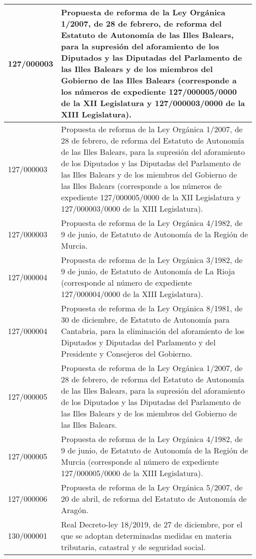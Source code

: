 {\begin{table}[H]
\begin{center}
\begin{tabularx}{\linewidth}{| l | X |}
\hline
127/000003 & Propuesta de reforma de la Ley Orgánica 1/2007, de 28 de febrero, de reforma del Estatuto de Autonomía de las Illes Balears, para la supresión del aforamiento de los Diputados y las Diputadas del Parlamento de las Illes Balears y de los miembros del Gobierno de las Illes Balears (corresponde a los números de expediente 127/000005/0000 de la XII Legislatura y 127/000003/0000 de la XIII Legislatura). \\
\hline
127/000003 & Propuesta de reforma de la Ley Orgánica 1/2007, de 28 de febrero, de reforma del Estatuto de Autonomía de las Illes Balears, para la supresión del aforamiento de los Diputados y las Diputadas del Parlamento de las Illes Balears y de los miembros del Gobierno de las Illes Balears (corresponde a los números de expediente 127/000005/0000 de la XII Legislatura y 127/000003/0000 de la XIII Legislatura). \\
\hline
127/000003 & Propuesta de reforma de la Ley Orgánica 4/1982, de 9 de junio, de Estatuto de Autonomía de la Región de Murcia. \\
\hline
127/000004 & Propuesta de reforma de la Ley Orgánica 3/1982, de 9 de junio, de Estatuto de Autonomía de La Rioja (corresponde al número de expediente 127/000004/0000 de la XIII Legislatura). \\
\hline
127/000004 & Propuesta de reforma de la Ley Orgánica 8/1981, de 30 de diciembre, de Estatuto de Autonomía para Cantabria, para la eliminación del aforamiento de los Diputados y Diputadas del Parlamento y del Presidente y Consejeros del Gobierno. \\
\hline
127/000005 & Propuesta de reforma de la Ley Orgánica 1/2007, de 28 de febrero, de reforma del Estatuto de Autonomía de las Illes Balears, para la supresión del aforamiento de los Diputados y las Diputadas del Parlamento de las Illes Balears y de los miembros del Gobierno de las Illes Balears. \\
\hline
127/000005 & Propuesta de reforma de la Ley Orgánica 4/1982, de 9 de junio, de Estatuto de Autonomía de la Región de Murcia (corresponde al número de expediente 127/000005/0000 de la XIII Legislatura). \\
\hline
127/000006 & Propuesta de reforma de la Ley Orgánica 5/2007, de 20 de abril, de reforma del Estatuto de Autonomía de Aragón. \\
\hline
130/000001 & Real Decreto-ley 18/2019, de 27 de diciembre, por el que se adoptan determinadas medidas en materia tributaria, catastral y de seguridad social. \\

\end{tabularx}
\end{center}
\end{table}}
